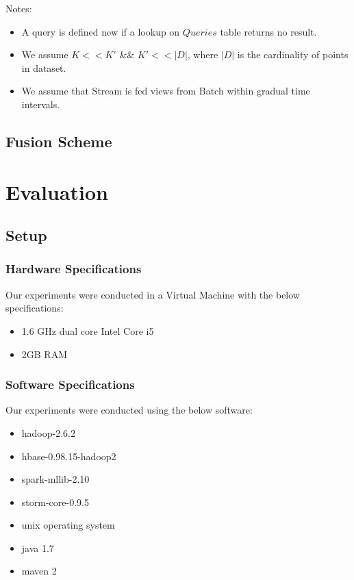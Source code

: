 \documentclass{lmproj}
\begin{document}
Notes:
\begin{itemize}
	\item A query is defined new if a lookup on $Queries$ table returns no result.
	\item We assume $K<<K'$ \&\& $K'<<|D|$, where $|D|$ is the cardinality of points in dataset.
	\item We assume that Stream is fed views from Batch within gradual time intervals.
\end{itemize}


\section{Fusion Scheme}
\label{kmeans}




\chapter{Evaluation}
\label{evaluation}

\section{Setup}
\label{evaluation}

\subsection{Hardware Specifications}
Our experiments were conducted in a Virtual Machine with the below specifications:
\begin{itemize}
	\item 1.6 GHz dual core Intel Core i5
	\item 2GB RAM
\end{itemize}

\subsection{Software Specifications}
Our experiments were conducted using the below software:
\begin{itemize}
	\item hadoop-2.6.2
	\item hbase-0.98.15-hadoop2
	\item spark-mllib-2.10
	\item storm-core-0.9.5
	\item unix operating system
	\item java 1.7
	\item maven 2
\end{itemize}
\end{document}
